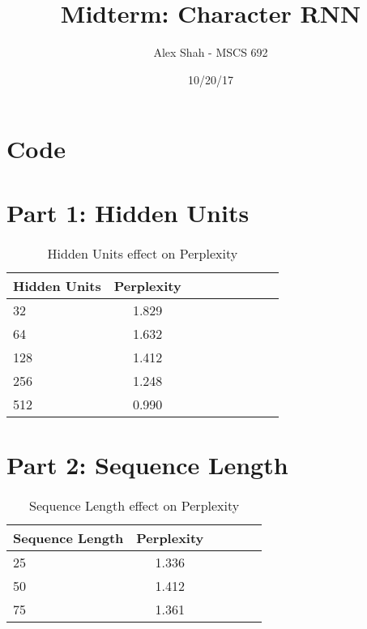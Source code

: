 \documentclass[10pt,a4paper]{report}
\title{Midterm: Character RNN}
\author{Alex Shah - MSCS 692}
\date{10/20/17}
\begin{document}
\lstset{language=Python}
\maketitle

\section{Code}


\clearpage

\section{Part 1: Hidden Units}

\begin{table}[h]
 \caption{Hidden Units effect on Perplexity}
 \label{tbl:aTable}
 \begin{center}
  \begin{tabular}{lccrrrrrr}
    \hline 
	Hidden Units & Perplexity\\
	\hline
	32 & 1.829\\
	64 & 1.632\\
	128 & 1.412\\
	256 & 1.248\\
	512 & 0.990\\
  \end{tabular}
 \end{center}
\end{table}

\section{Part 2: Sequence Length}

\begin{table}[h]
 \caption{Sequence Length effect on Perplexity}
 \label{tbl:bTable}
 \begin{center}
  \begin{tabular}{lccrrr}
    \hline 
	Sequence Length & Perplexity\\
	\hline
	25 & 1.336\\
	50 & 1.412\\
	75 & 1.361\\
  \end{tabular}
 \end{center}
\end{table}
\end{document}
